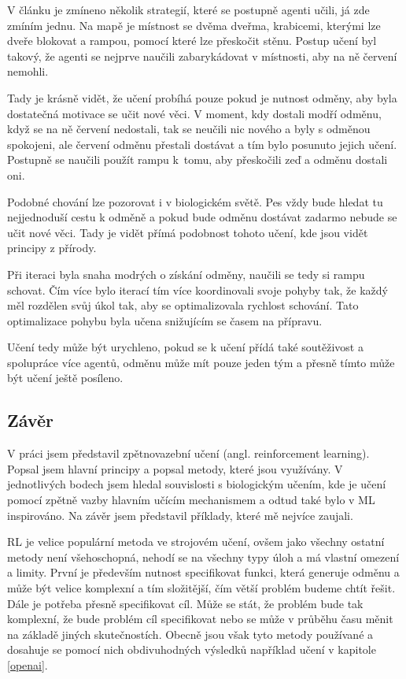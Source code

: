 \documentclass{article}
\begin{document}
V článku je zmíneno několik strategií, které se postupně agenti učili, já zde zmíním jednu. Na mapě je místnost se dvěma dveřma, krabicemi, kterými lze dveře blokovat a rampou, pomocí které lze přeskočit stěnu. Postup učení byl takový, že agenti se nejprve naučili zabarykádovat v místnosti, aby na ně červení nemohli. 

Tady je krásně vidět, že učení probíhá pouze pokud je nutnost odměny, aby byla dostatečná motivace se učit nové věci. V moment, kdy dostali modří odměnu, když se na ně červení nedostali, tak se neučili nic nového a byly s  odměnou spokojeni, ale červení odměnu přestali dostávat a tím bylo posunuto jejich učení. Postupně se naučili použít rampu k~tomu, aby přeskočili zeď a odměnu dostali oni. 

Podobné chování lze pozorovat i v biologickém světě. Pes vždy bude hledat tu nejjednoduší cestu k odměně a pokud bude odměnu dostávat zadarmo nebude se učit nové věci. Tady je vidět přímá podobnost tohoto učení, kde jsou vidět principy z přírody.

Při iteraci byla snaha modrých o získání odměny, naučili se tedy si rampu schovat. Čím více bylo iterací tím více koordinovali svoje pohyby tak, že každý měl rozdělen svůj úkol tak, aby se optimalizovala rychlost schování. Tato optimalizace pohybu byla učena snižujícím se časem na přípravu.

Učení tedy může být urychleno, pokud se k učení přídá také soutěživost a spolupráce více agentů, odměnu může mít pouze jeden tým a přesně tímto může být učení ještě posíleno.

\subsection{Závěr} 

V práci jsem představil zpětnovazební učení (angl. reinforcement learning). Popsal jsem hlavní principy a popsal metody, které jsou využívány. V jednotlivých bodech jsem hledal souvislosti s biologickým učením, kde je učení pomocí zpětně vazby hlavním učícím mechanismem a odtud také bylo v ML inspirováno. Na závěr jsem představil příklady, které mě nejvíce zaujali.

RL je velice populární metoda ve strojovém učení, ovšem jako všechny ostatní metody není všehoschopná, nehodí se na všechny typy úloh a má vlastní omezení a limity. První je především nutnost specifikovat funkci, která generuje odměnu a může být velice komplexní a tím složitější, čím větší problém budeme chtít řešit. Dále je potřeba přesně specifikovat cíl. Může se stát, že problém bude tak komplexní, že bude problém cíl specifikovat nebo se může v průběhu času měnit na základě jiných skutečnostích. Obecně jsou však tyto metody používané a dosahuje se pomocí nich obdivuhodných výsledků například učení v kapitole \ref{openai}. 
\end{document}
